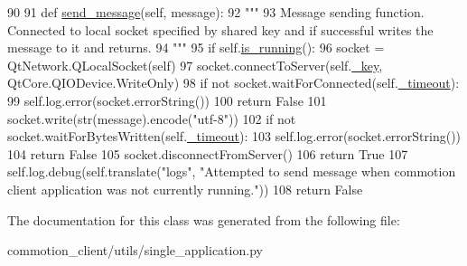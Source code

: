 \begin{DoxyCode}
90 
91     \textcolor{keyword}{def }\hyperlink{classcommotion__client_1_1utils_1_1single__application_1_1SingleApplicationWithMessaging_a07475e0643ef2f92a0e990e7feefa4e3}{send\_message}(self, message):
92         \textcolor{stringliteral}{"""}
93 \textcolor{stringliteral}{        Message sending function. Connected to local socket specified by shared key and if successful
       writes the message to it and returns.}
94 \textcolor{stringliteral}{        """}
95         \textcolor{keywordflow}{if} self.\hyperlink{classcommotion__client_1_1utils_1_1single__application_1_1SingleApplication_acf757577a5b8729d162c828275e1b948}{is\_running}():
96             socket = QtNetwork.QLocalSocket(self)
97             socket.connectToServer(self.\hyperlink{classcommotion__client_1_1utils_1_1single__application_1_1SingleApplication_a9c95e184472415ffd42cb82dcf14a332}{\_key}, QtCore.QIODevice.WriteOnly)
98             \textcolor{keywordflow}{if} \textcolor{keywordflow}{not} socket.waitForConnected(self.\hyperlink{classcommotion__client_1_1utils_1_1single__application_1_1SingleApplicationWithMessaging_ae4ca7cb1d3bf9e9ebc683c953c8c08f4}{\_timeout}):
99                 self.log.error(socket.errorString())
100                 \textcolor{keywordflow}{return} \textcolor{keyword}{False}
101             socket.write(str(message).encode(\textcolor{stringliteral}{"utf-8"}))
102             \textcolor{keywordflow}{if} \textcolor{keywordflow}{not} socket.waitForBytesWritten(self.\hyperlink{classcommotion__client_1_1utils_1_1single__application_1_1SingleApplicationWithMessaging_ae4ca7cb1d3bf9e9ebc683c953c8c08f4}{\_timeout}):
103                 self.log.error(socket.errorString())
104                 \textcolor{keywordflow}{return} \textcolor{keyword}{False}
105             socket.disconnectFromServer()
106             \textcolor{keywordflow}{return} \textcolor{keyword}{True}
107         self.log.debug(self.translate(\textcolor{stringliteral}{"logs"}, \textcolor{stringliteral}{"Attempted to send message when commotion client application
       was not currently running."}))
108         \textcolor{keywordflow}{return} \textcolor{keyword}{False}

\end{DoxyCode}


The documentation for this class was generated from the following file\+:\begin{DoxyCompactItemize}
\item 
commotion\+\_\+client/utils/single\+\_\+application.\+py\end{DoxyCompactItemize}
